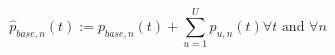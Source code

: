 \begin{equation}
	\hat{p}_{base,n}(t) := p_{base,n}(t) + \sum_{u=1}^{U} p_{u,n}(t) \forall t \text{ and } \forall n
	\label{ch3:equ:updated-demand-profile}
\end{equation}